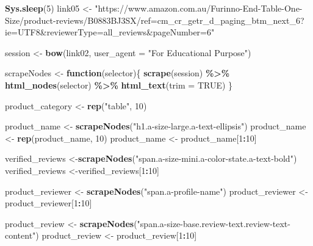 \documentclass[
]{article}
\newenvironment{Shaded}{\begin{snugshade}}{\end{snugshade}}
\newcommand{\AttributeTok}[1]{\textcolor[rgb]{0.13,0.29,0.53}{#1}}
\newcommand{\ConstantTok}[1]{\textcolor[rgb]{0.56,0.35,0.01}{#1}}
\newcommand{\ControlFlowTok}[1]{\textcolor[rgb]{0.13,0.29,0.53}{\textbf{#1}}}
\newcommand{\DecValTok}[1]{\textcolor[rgb]{0.00,0.00,0.81}{#1}}
\newcommand{\FunctionTok}[1]{\textcolor[rgb]{0.13,0.29,0.53}{\textbf{#1}}}
\newcommand{\NormalTok}[1]{#1}
\newcommand{\OtherTok}[1]{\textcolor[rgb]{0.56,0.35,0.01}{#1}}
\newcommand{\SpecialCharTok}[1]{\textcolor[rgb]{0.81,0.36,0.00}{\textbf{#1}}}
\newcommand{\StringTok}[1]{\textcolor[rgb]{0.31,0.60,0.02}{#1}}
\begin{document}
\begin{Shaded}
\begin{Highlighting}[]
   \FunctionTok{Sys.sleep}\NormalTok{(}\DecValTok{5}\NormalTok{)}
\NormalTok{link05 }\OtherTok{\textless{}{-}} \StringTok{"https://www.amazon.com.au/Furinno{-}End{-}Table{-}One{-}Size/product{-}reviews/B0883BJ3SX/ref=cm\_cr\_getr\_d\_paging\_btm\_next\_6?ie=UTF8\&reviewerType=all\_reviews\&pageNumber=6"}


\NormalTok{  session }\OtherTok{\textless{}{-}} \FunctionTok{bow}\NormalTok{(link02,}
               \AttributeTok{user\_agent =} \StringTok{"For Educational Purpose"}\NormalTok{)}

\NormalTok{  scrapeNodes }\OtherTok{\textless{}{-}} \ControlFlowTok{function}\NormalTok{(selector)\{}
    \FunctionTok{scrape}\NormalTok{(session) }\SpecialCharTok{\%\textgreater{}\%}
      \FunctionTok{html\_nodes}\NormalTok{(selector) }\SpecialCharTok{\%\textgreater{}\%}
      \FunctionTok{html\_text}\NormalTok{(}\AttributeTok{trim =} \ConstantTok{TRUE}\NormalTok{)}
\NormalTok{  \}}

\NormalTok{  product\_category }\OtherTok{\textless{}{-}} \FunctionTok{rep}\NormalTok{(}\StringTok{"table"}\NormalTok{, }\DecValTok{10}\NormalTok{)}

\NormalTok{  product\_name }\OtherTok{\textless{}{-}} \FunctionTok{scrapeNodes}\NormalTok{(}\StringTok{"h1.a{-}size{-}large.a{-}text{-}ellipsis"}\NormalTok{)}
\NormalTok{  product\_name }\OtherTok{\textless{}{-}} \FunctionTok{rep}\NormalTok{(product\_name, }\DecValTok{10}\NormalTok{)}
\NormalTok{  product\_name }\OtherTok{\textless{}{-}}\NormalTok{ product\_name[}\DecValTok{1}\SpecialCharTok{:}\DecValTok{10}\NormalTok{]}
  
\NormalTok{  verified\_reviews }\OtherTok{\textless{}{-}}\FunctionTok{scrapeNodes}\NormalTok{(}\StringTok{"span.a{-}size{-}mini.a{-}color{-}state.a{-}text{-}bold"}\NormalTok{)}
\NormalTok{  verified\_reviews }\OtherTok{\textless{}{-}}\NormalTok{verified\_reviews[}\DecValTok{1}\SpecialCharTok{:}\DecValTok{10}\NormalTok{]}
  
\NormalTok{  product\_reviewer }\OtherTok{\textless{}{-}} \FunctionTok{scrapeNodes}\NormalTok{(}\StringTok{"span.a{-}profile{-}name"}\NormalTok{)}
\NormalTok{  product\_reviewer }\OtherTok{\textless{}{-}}\NormalTok{ product\_reviewer[}\DecValTok{1}\SpecialCharTok{:}\DecValTok{10}\NormalTok{]}
  
\NormalTok{  product\_review }\OtherTok{\textless{}{-}} \FunctionTok{scrapeNodes}\NormalTok{(}\StringTok{"span.a{-}size{-}base.review{-}text.review{-}text{-}content"}\NormalTok{)}
\NormalTok{  product\_review }\OtherTok{\textless{}{-}}\NormalTok{ product\_review[}\DecValTok{1}\SpecialCharTok{:}\DecValTok{10}\NormalTok{]}
  

\end{Highlighting}
\end{Shaded}
\end{document}
